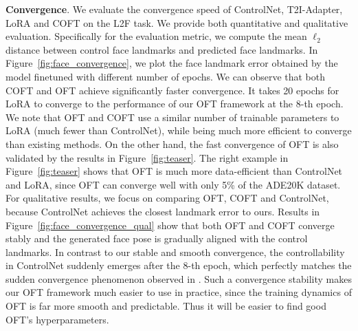 \textbf{Convergence}. We evaluate the convergence speed of ControlNet, T2I-Adapter, LoRA and COFT on the L2F task. We provide both quantitative and qualitative evaluation. Specifically for the evaluation metric, we compute the mean $\ell_2$ distance between control face landmarks and predicted face landmarks. In Figure~\ref{fig:face_convergence}, we plot the face landmark error obtained by the model finetuned with different number of epochs. We can observe that both COFT and OFT achieve significantly faster convergence. It takes 20 epochs for LoRA to converge to the performance of our OFT framework at the 8-th epoch. We note that OFT and COFT use a similar number of trainable parameters to LoRA (much fewer than ControlNet), while being much more efficient to converge than existing methods. On the other hand, the fast convergence of OFT is also validated by the results in Figure~\ref{fig:teaser}. The right example in Figure~\ref{fig:teaser} shows that OFT is much more data-efficient than ControlNet and LoRA, since OFT can converge well with only 5\% of the ADE20K dataset. For qualitative results, we focus on comparing OFT, COFT and ControlNet, because ControlNet achieves the closest landmark error to ours. Results in Figure~\ref{fig:face_convergence_qual} show that both OFT and COFT converge stably and the generated face pose is gradually aligned with the control landmarks. In contrast to our stable and smooth convergence, the controllability in ControlNet suddenly emerges after the 8-th epoch, which perfectly matches the sudden convergence phenomenon observed in \cite{zhang2023adding}. Such a convergence stability makes our OFT framework much easier to use in practice, since the training dynamics of OFT is far more smooth and predictable. Thus it will be easier to find good OFT's hyperparameters.

